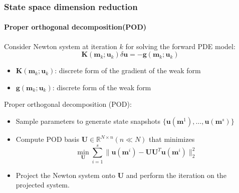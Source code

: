 \documentclass{beamer}
\begin{document}
\begin{frame}
  \frametitle{State space dimension reduction}
  \framesubtitle{Proper orthogonal decomposition(POD)}

  Consider Newton system at iteration $k$ for solving the forward PDE model:
  \[
    \mathbf{K}(\mathbf{m}_k; \mathbf{u}_k) \delta \mathbf{u} = - \mathbf{g}
    (\mathbf{m}_k; \mathbf{u}_k)
  \]
  \vspace{-0.5cm}
  \begin{itemize}
    \item $\mathbf{K}(\mathbf{m}_k; \mathbf{u}_k)$: discrete form of the gradient of the weak form
    \item $\mathbf{g} (\mathbf{m}_k; \mathbf{u}_k)$: discrete form of the weak
      form
  \end{itemize}

  \begin{block}{Proper orthogonal decomposition (POD):}
    \begin{itemize}
      \item Sample parameters to generate state snapshots
        $\{\mathbf{u}(\mathbf{m}^1), \ldots, \mathbf{u}(\mathbf{m}^s)\}$
      \item Compute POD basis $\mathbf{U} \in \mathbb{R}^{N \times n} (n \ll N)$ that minimizes
        \[
          \min_{\mathbf{U}} \sum_{i=1}^{s} \|\mathbf{u}(\mathbf{m}^i) -
          \mathbf{U}\mathbf{U}^T\mathbf{u}(\mathbf{m}^i)\|_2^2
        \]
      \item Project the Newton system onto $\mathbf{U}$ and perform the iteration on the projected system.

    \end{itemize}
  \end{block}
\end{frame}
\end{document}
